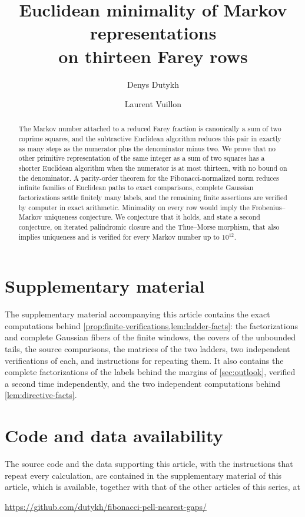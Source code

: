 \documentclass[11pt,reqno]{amsart}
\title[Euclidean minimality on thirteen Farey rows]{Euclidean minimality of Markov representations\\on thirteen Farey rows}
\author{Denys Dutykh}
\author{Laurent Vuillon}
\theoremstyle{definition}
\theoremstyle{plain}
\theoremstyle{definition}
\begin{document}
\begin{abstract}
The Markov number attached to a reduced Farey fraction is canonically a sum
of two coprime squares, and the subtractive Euclidean algorithm reduces this
pair in exactly as many steps as the numerator plus the denominator minus
two. We prove that no other primitive representation of the same integer as
a sum of two squares has a shorter Euclidean algorithm when the numerator is
at most thirteen, with no bound on the denominator. A parity-order theorem
for the Fibonacci-normalized norm reduces infinite families of Euclidean
paths to exact comparisons, complete Gaussian factorizations settle finitely
many labels, and the remaining finite assertions are verified by computer in
exact arithmetic. Minimality on every row would imply the Frobenius--Markov
uniqueness conjecture. We conjecture that it holds, and state a second
conjecture, on iterated palindromic closure and the Thue--Morse
morphism, that also implies uniqueness and is verified for every Markov
number up to $10^{12}$.
\end{abstract}
\maketitle







\section*{Supplementary material}
The supplementary material accompanying this article contains the exact
computations behind \cref{prop:finite-verifications,lem:ladder-facts}: the
factorizations and complete Gaussian fibers of the finite windows, the
covers of the unbounded tails, the source comparisons, the matrices of the
two ladders, two independent verifications of each, and instructions for
repeating them. It also contains the complete factorizations of the labels
behind the margins of \cref{sec:outlook}, verified a second time
independently, and the two independent computations behind
\cref{lem:directive-facts}.

\section*{Code and data availability}
{ 
The source code and the data supporting this article, with the instructions
that repeat every calculation, are contained in the supplementary material of
this article, which is available, together with that of the other articles of
this series, at
\par}
\begin{center}
  \url{https://github.com/dutykh/fibonacci-pell-nearest-gaps/}
\end{center}
\end{document}
